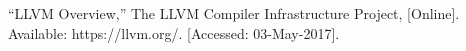 \documentclass[conference]{IEEEtran}
\begin{document}





%
%
%
\begin{thebibliography}{1}
“LLVM Overview,” The LLVM Compiler Infrastructure Project, [Online]. Available: https://llvm.org/. [Accessed: 03-May-2017].
\end{thebibliography}
\end{document}
